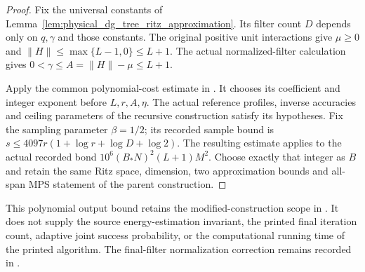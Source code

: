 \begin{proof}\leanok
    Fix the universal constants of
    Lemma~\ref{lem:physical_dg_tree_ritz_approximation}. Its filter
    count $D$ depends only on $q,\gamma$ and those constants.
    The original positive unit interactions give $\mu\geq0$ and
    $\|H\|\leq\max\{L-1,0\}\leq L+1$.
    The actual normalized-filter calculation gives
    $0<\gamma\leq A=\|H\|-\mu\leq L+1$.

    Apply the common polynomial-cost estimate in
    \cite[``A polynomial bound for the complete refinement cost'']{QICLean2026Blueprint}.
    It chooses its coefficient and integer exponent before $L,r,A,\eta$.
    The actual reference profiles, inverse accuracies and ceiling
    parameters of the recursive construction satisfy its hypotheses.
    Fix the sampling parameter $\beta=1/2$; its recorded sample bound
    is $s\leq4097r(1+\log r+\log D+\log2)$.
    The resulting estimate applies to the actual recorded bond
    $10^6(B_*N)^2(L+1)M^2$.
    Choose exactly that integer as $B$ and retain the same Ritz
    space, dimension, two approximation bounds and all-span MPS
    statement of the parent construction.
\end{proof}

This polynomial output bound retains the modified-construction scope in
\cite{gap:alvv16_approximation_parameters}. It does not supply the
source energy-estimation invariant, the printed final iteration count,
adaptive joint success probability, or the computational running time
of the printed algorithm. The final-filter normalization correction
remains recorded in \cite{gap:alvv16_final_filter_gain}.
